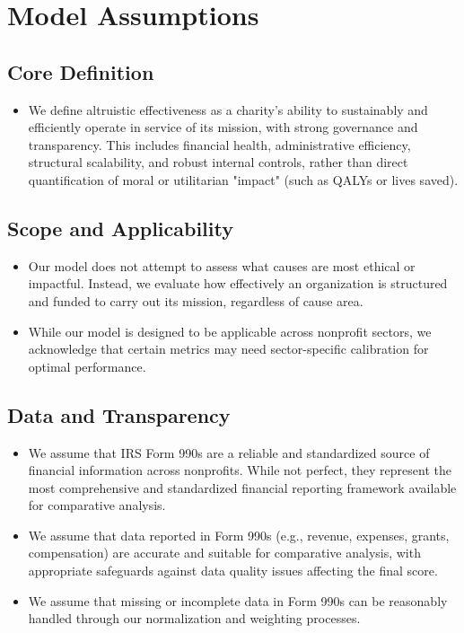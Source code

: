\documentclass[12pt]{article}
\begin{document}
\section*{Model Assumptions}

\subsection*{Core Definition}
\begin{itemize}
    \item We define altruistic effectiveness as a charity's ability to sustainably and efficiently operate in service of its mission, with strong governance and transparency. This includes financial health, administrative efficiency, structural scalability, and robust internal controls, rather than direct quantification of moral or utilitarian "impact" (such as QALYs or lives saved).
\end{itemize}

\subsection*{Scope and Applicability}
\begin{itemize}
    \item Our model does not attempt to assess what causes are most ethical or impactful. Instead, we evaluate how effectively an organization is structured and funded to carry out its mission, regardless of cause area.
    
    \item While our model is designed to be applicable across nonprofit sectors, we acknowledge that certain metrics may need sector-specific calibration for optimal performance.
\end{itemize}

\subsection*{Data and Transparency}
\begin{itemize}
    \item We assume that IRS Form 990s are a reliable and standardized source of financial information across nonprofits. While not perfect, they represent the most comprehensive and standardized financial reporting framework available for comparative analysis.
    
    \item We assume that data reported in Form 990s (e.g., revenue, expenses, grants, compensation) are accurate and suitable for comparative analysis, with appropriate safeguards against data quality issues affecting the final score.
    
    \item We assume that missing or incomplete data in Form 990s can be reasonably handled through our normalization and weighting processes.
\end{itemize}
\end{document}
